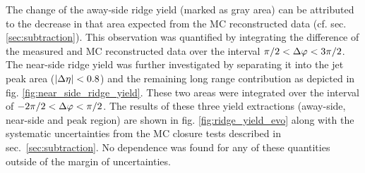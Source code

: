 The change of the \gls{away-side} ridge yield (marked as gray area) can be attributed to the decrease in that area expected from the MC reconstructed data (cf. sec. \ref{sec:subtraction}). This observation was quantified by integrating the difference of the measured and MC reconstructed data over the interval  $\pi / 2 < \Delta\varphi < 3\pi/2$. The \gls{near-side} ridge yield was further investigated by separating it into the jet peak area ($|\Delta\eta| < 0.8$) and the remaining long range contribution as depicted in fig. \ref{fig:near_side_ridge_yield}. These two areas were integrated over the interval of $-2\pi /2 < \Delta\varphi < \pi /2$. The results of these three yield extractions (away-side, near-side and peak region) are shown in fig. \ref{fig:ridge_yield_evo} along with the systematic uncertainties from the MC closure tests described in sec.~\ref{sec:subtraction}. No \ptthresh dependence was found for any of these quantities outside of the margin of uncertainties.


